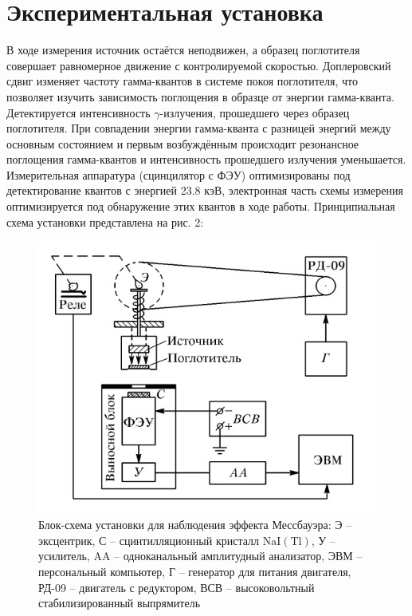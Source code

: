 \documentclass[a4paper, 12pt]{article}
\begin{document}
\section{Экспериментальная установка}
В ходе измерения источник остаётся неподвижен, а образец поглотителя совершает равномерное движение с контролируемой скоростью. Доплеровский сдвиг изменяет частоту гамма-квантов в системе покоя поглотителя, что позволяет изучить зависимость поглощения в образце от энергии гамма-кванта. Детектируется интенсивность $\gamma$-излучения, прошедшего через образец поглотителя. При совпадении энергии гамма-кванта с разницей энергий между основным состоянием и первым возбуждённым происходит резонансное поглощения гамма-квантов и интенсивность прошедшего излучения уменьшается. Измерительная аппаратура (сцинцилятор с ФЭУ) оптимизированы под детектирование квантов с энергией 23.8 кэВ, электронная часть схемы измерения оптимизируется под обнаружение этих квантов в ходе работы. Принципиальная схема установки представлена на рис. 2:

\begin{figure}[h!]
\begin{center}
\includegraphics[scale=0.6]{2} %
\caption{Блок-схема установки для наблюдения эффекта Мессбауэра: Э -- эксцентрик, С -- сцинтилляционный кристалл $\mathrm{NaI}(\mathrm{Tl})$, У -- усилитель, $\mathrm{AA}$ -- одноканальный амплитудный анализатор, ЭВМ -- персональный компьютер, Г -- генератор для питания двигателя, РД-09 -- двигатель с редуктором, ВСВ -- высоковольтный стабилизированный выпрямитель}
\end{center}
\end{figure}
\end{document}
